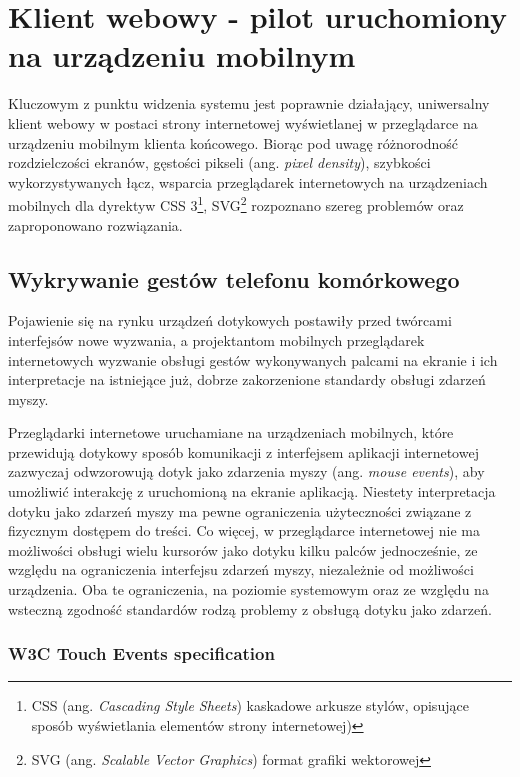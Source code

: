 \section{Klient webowy - pilot uruchomiony na urządzeniu mobilnym}

Kluczowym z punktu widzenia systemu jest poprawnie działający, uniwersalny klient webowy w postaci strony internetowej wyświetlanej w przeglądarce na urządzeniu mobilnym klienta końcowego. Biorąc pod uwagę różnorodność rozdzielczości ekranów, gęstości pikseli (ang. \emph{pixel density}), szybkości wykorzystywanych łącz, wsparcia przeglądarek internetowych na urządzeniach mobilnych dla dyrektyw CSS 3\footnote{CSS (ang. \emph{Cascading Style Sheets}) kaskadowe arkusze stylów, opisujące sposób wyświetlania elementów strony internetowej)}, SVG\footnote{SVG (ang. \emph{Scalable Vector Graphics}) format grafiki wektorowej} rozpoznano szereg problemów oraz zaproponowano rozwiązania.

\subsection{Wykrywanie gestów telefonu komórkowego}

Pojawienie się na rynku urządzeń dotykowych postawiły przed twórcami interfejsów nowe wyzwania, a projektantom mobilnych przeglądarek internetowych wyzwanie obsługi gestów wykonywanych palcami na ekranie i ich interpretacje na istniejące już, dobrze zakorzenione standardy obsługi zdarzeń myszy.

Przeglądarki internetowe uruchamiane na urządzeniach mobilnych, które przewidują dotykowy sposób komunikacji z interfejsem aplikacji internetowej zazwyczaj odwzorowują dotyk jako zdarzenia myszy (ang. \emph{mouse events}), aby umożliwić interakcję z uruchomioną na ekranie aplikacją. Niestety interpretacja dotyku jako zdarzeń myszy ma pewne ograniczenia użyteczności związane z fizycznym dostępem do treści. Co więcej, w przeglądarce internetowej nie ma możliwości obsługi wielu kursorów jako dotyku kilku palców jednocześnie, ze względu na ograniczenia interfejsu zdarzeń myszy, niezależnie od możliwości urządzenia. Oba te ograniczenia, na poziomie systemowym oraz ze względu na wsteczną zgodność standardów rodzą problemy z obsługą dotyku jako zdarzeń.

\subsubsection{W3C Touch Events specification}

